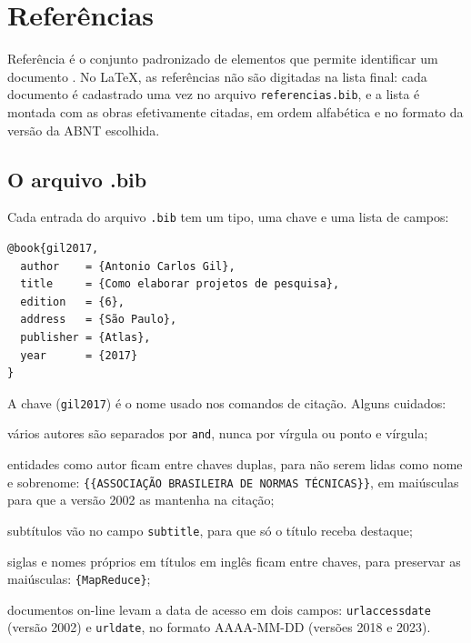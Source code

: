 \chapter{Referências}\label{cap:referencias}

Referência é o conjunto padronizado de elementos que permite identificar um documento \cite{abnt6023}. No \LaTeX, as referências não são digitadas na lista final: cada documento é cadastrado uma vez no arquivo \texttt{referencias.bib}, e a lista é montada com as obras efetivamente citadas, em ordem alfabética e no formato da versão da ABNT escolhida.

\section{O arquivo .bib}\label{sec:arquivo-bib}

Cada entrada do arquivo \texttt{.bib} tem um tipo, uma chave e uma lista de campos:

\begin{verbatim}
@book{gil2017,
  author    = {Antonio Carlos Gil},
  title     = {Como elaborar projetos de pesquisa},
  edition   = {6},
  address   = {São Paulo},
  publisher = {Atlas},
  year      = {2017}
}
\end{verbatim}

A chave (\texttt{gil2017}) é o nome usado nos comandos de citação. Alguns cuidados:

\begin{alineas}
	\item vários autores são separados por \texttt{and}, nunca por vírgula ou ponto e vírgula;
	\item entidades como autor ficam entre chaves duplas, para não serem lidas como nome e sobrenome: \verb|{{ASSOCIAÇÃO BRASILEIRA DE NORMAS TÉCNICAS}}|, em maiúsculas para que a versão 2002 as mantenha na citação;
	\item subtítulos vão no campo \texttt{subtitle}, para que só o título receba destaque;
	\item siglas e nomes próprios em títulos em inglês ficam entre chaves, para preservar as maiúsculas: \verb|{MapReduce}|;
	\item documentos on-line levam a data de acesso em dois campos: \texttt{urlaccessdate} (versão 2002) e \texttt{urldate}, no formato AAAA-MM-DD (versões 2018 e 2023).
\end{alineas}

